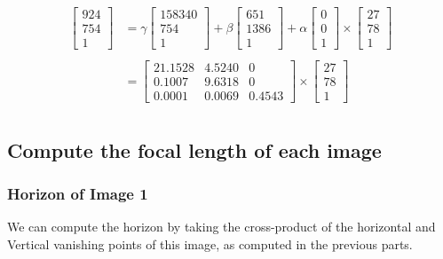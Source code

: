 \documentclass[12pt, oneside]{article}
\begin{document}
\begin{align*}
    \begin{bmatrix} 924   \\ 754   \\ 1   \end{bmatrix}  &= 
    \gamma  \begin{bmatrix} 158340  \\ 754 \\ 1  \end{bmatrix} + 
    \beta \begin{bmatrix} 651   \\ 1386   \\   1   \end{bmatrix} + 
    \alpha \begin{bmatrix} 0   \\ 0   \\   1   \end{bmatrix} \times 
    \begin{bmatrix} 27 \\ 78 \\ 1  \end{bmatrix} \\ \\
      &= \begin{bmatrix}
      21.1528     &   4.5240  & 0 \\
      0.1007       &   9.6318   & 0 \\
      0.0001       &   0.0069 & 0.4543
      \end{bmatrix} \times 
      \begin{bmatrix} 27 \\ 78 \\ 1  \end{bmatrix} \\
  \end{align*} 

\subsection{Compute the focal length of each image}

\subsubsection*{Horizon of Image 1} 

We can compute the horizon by taking the cross-product of the horizontal and Vertical
vanishing points of this image, as computed in the previous parts.
\end{document}

